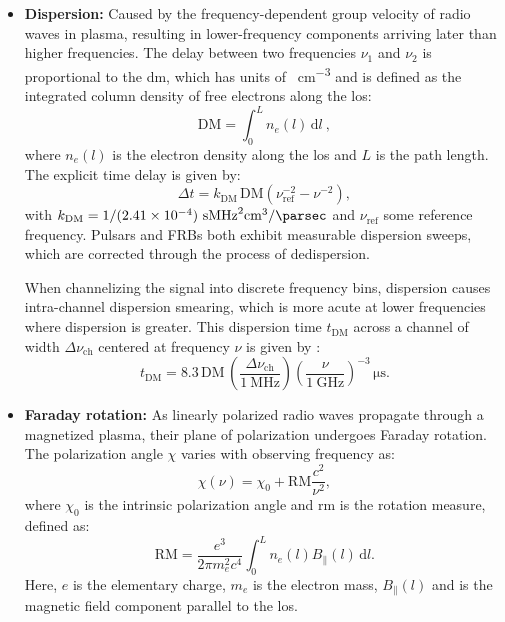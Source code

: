 \begin{itemize}
	\item \textbf{Dispersion:} Caused by the frequency-dependent group velocity of radio waves in plasma, resulting in lower-frequency components arriving later than higher frequencies. The delay between two frequencies $\nu_1$ and $\nu_2$ is proportional to the \gls{dm}, which has units of \si{\parsec \per \centi \meter \cubed} and is defined as the integrated column density of free electrons along the \gls{los}:
			\begin{equation}
				\mathrm{DM} = \int_0^L n_e(l) \, \mathrm{d}l \ ,
			\end{equation}
			where $n_e(l)$ is the electron density along the \gls{los} and $L$ is the path length. The explicit time delay is given by:
			\begin{equation}
				\Delta t = k_{\text{DM}} \, \mathrm{DM} \left( \nu_\text{ref}^{-2} - \nu^{-2} \right) ,
			\end{equation}
			with $k_{\text{DM}} = 1/(2.41\times10^{-4}) \ \si{\second \mega \hertz \squared \centi \meter \cubed \per \parsec }$ and $\nu_\text{ref} $ some reference frequency. Pulsars and FRBs both exhibit measurable dispersion sweeps, which are corrected through the process of dedispersion.
			
			When channelizing the signal into discrete frequency bins, dispersion causes intra-channel dispersion smearing, which is more acute at lower frequencies where dispersion is greater. This dispersion time $t_{\text{DM}}$ across a channel of width $\Delta \nu_\text{ch}$ centered at frequency $\nu$ is given by \citep{LiamConnor2019}:
			\begin{equation}
			t_{\text{DM}} = 8.3 \, \text{DM} \, \left( \frac{\Delta \nu_\text{ch}}{\SI{1}{\mega\hertz}} \right) \left( \frac{\nu}{\SI{1}{\giga\hertz}} \right)^{-3} \, \si{\micro\second}.
			\label{eq:intra_channel_smearing}
			\end{equation}

			\item \textbf{Faraday rotation:} As linearly polarized radio waves propagate through a magnetized plasma, their plane of polarization undergoes Faraday rotation. The polarization angle $\chi$ varies with observing frequency as:
			\begin{equation}
			\chi(\nu) = \chi_0 + \mathrm{RM}\frac{c^2}{\nu^2},
			\label{eq:faraday_rotation}
			\end{equation}
			where $\chi_0$ is the intrinsic polarization angle and \gls{rm} is the rotation measure, defined as:
			\begin{equation}
			\mathrm{RM} = \frac{e^3}{2\pi m_e^2 c^4} \int_0^L n_e(l) B_\parallel(l) \, \mathrm{d}l .
			\end{equation}
			Here, $e$ is the elementary charge, $m_e$ is the electron mass, $B_\parallel(l)$ and is the magnetic field component parallel to the \gls{los}.


\end{itemize}
